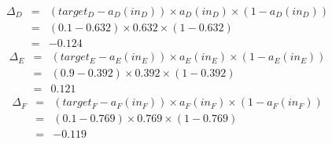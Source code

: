 \documentclass[solution]{ditpaper}
\begin{document}
\begin{enumerate}
\begin{enumerate}
		\begin{answer}
		\begin{eqnarray*}
		\Delta_D& = &(target_D - a_D(in_D)) \times a_D(in_D) \times (1-a_D(in_D))\\
		& = &(0.1-0.632) \times 0.632 \times (1-0.632)\\
		& = &-0.124
		\end{eqnarray*}
		\begin{eqnarray*}
		\Delta_E& = &(target_E - a_E(in_E)) \times a_E(in_E) \times (1-a_E(in_E))\\
		& = &(0.9-0.392) \times 0.392 \times (1-0.392)\\
		& = &0.121
		\end{eqnarray*}
		\begin{eqnarray*}
		\Delta_F& = &(target_F - a_F(in_F)) \times a_F(in_F) \times (1-a_F(in_F))\\
		& = &(0.1-0.769) \times 0.769 \times (1-0.769)\\
		& = &-0.119
		\end{eqnarray*}
		\end{answer}
%

\end{enumerate}
\end{enumerate}
\end{document}
